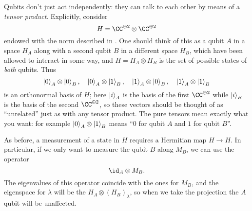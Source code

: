 \documentclass[11pt]{scrreprt}
\begin{document}
Qubits don't just act independently:
they can talk to each other by means of a \emph{tensor product}.
Explicitly, consider \[ H = \CC^{\oplus 2} \otimes \CC^{\oplus 2} \]
endowed with the norm described in .
One should think of this as a qubit $A$ in a space $H_A$
along with a second qubit $B$ in a different space $H_B$,
which have been allowed to interact in some way,
and $H = H_A \otimes H_B$ is the set of possible states of \emph{both} qubits.
Thus
\[ 
	\ket{0}_A \otimes \ket{0}_B, \quad
	\ket{0}_A \otimes \ket{1}_B, \quad
	\ket{1}_A \otimes \ket{0}_B, \quad
	\ket{1}_A \otimes \ket{1}_B
\]
is an orthonormal basis of $H$;
here $\ket{i}_A$ is the basis of the first $\CC^{\oplus 2}$
while $\ket{i}_B$ is the basis of the second $\CC^{\oplus 2}$,
so these vectors should be thought of as ``unrelated''
just as with any tensor product.
The pure tensors mean exactly what you want:
for example $\ket0_A \otimes \ket1_B$ means
``$0$ for qubit $A$ and $1$ for qubit $B$''.

As before, a measurement of a state in $H$ requires
a Hermitian map $H \to H$.
In particular, if we only want to measure the qubit $B$ along $M_B$,
we can use the operator \[ \id_A \otimes M_B. \]
The eigenvalues of this operator coincide with the ones for $M_B$,
and the eigenspace for $\lambda$ will be the $H_A \otimes (H_B)_\lambda$,
so when we take the projection the $A$ qubit will be unaffected.
\end{document}
